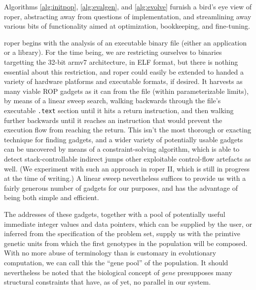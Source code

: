 \documentclass[12pt,glossary]{dalthesis}
\begin{document}
Algorithms \ref{alg:initpop}, \ref{alg:evalgen}, and \ref{alg:evolve}
furnish a bird's eye view of \gls{roper}, abstracting away from questions of
implementation, and streamlining away various bits of functionality
aimed at optimization, bookkeeping, and fine-tuning.

\gls{roper} begins with the analysis of an executable binary file (either an
application or a library). For the time being, we are restricting
ourselves to binaries targetting the 32-bit \gls{armv7} architecture, in ELF
format, but there is nothing essential about this restriction, and
\gls{roper} could easily be extended to handed a variety of hardware
platforms and executable formats, if desired. It harvests as many viable
ROP gadgets as it can from the file (within parameterizable limits), by 
means of a linear sweep search, walking backwards through the file's
executable \texttt{.text} section until it hits a return instruction, and then
walking further backwards until it reaches an instruction that would
prevent the execution flow from reaching the return. This isn't the
most thorough or exacting technique for finding gadgets, and a wider
variety of potentially usable gadgets can be uncovered by means of
a constraint-solving algorithm, which is able to detect stack-controllable
indirect jumps other exploitable control-flow artefacts as well. (We experiment
with such an approach in \gls{roper} II, which is still in progress at the time of
writing.) A linear sweep nevertheless suffices to provide us with a fairly
generous number of gadgets for our purposes, and has the advantage of being
both simple and efficient.

The addresses of these gadgets, together with a pool of potentially useful
immediate integer values and data pointers, which can be supplied by the
user, or inferred from the specification of the problem set, supply us with
the primtive genetic units from which the first genotypes in the population will
be composed. With no more abuse of terminology than is customary in evolutionary
computation, we can call this the ``gene pool'' of the population. It should
nevertheless be noted that the biological concept of \emph{gene} presupposes many
structural constraints that have, as of yet, no parallel in our system.
\end{document}
